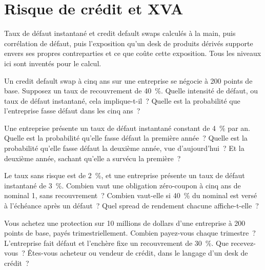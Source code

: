 \chapter{Risque de crédit et XVA}\label{ch:iv2:credit-and-xva}

\begin{ivtrains}
Taux de défaut instantané et credit default swaps calculés à la main, puis corrélation de défaut, puis l'exposition qu'un desk de produits dérivés supporte envers ses propres contreparties et ce que coûte cette exposition. Tous les niveaux ici sont inventés pour le calcul.
\end{ivtrains}

\begin{question}\label{iq:iv2:credit-and-xva:1}
Un credit default swap à cinq ans sur une entreprise se négocie à 200 points de base. Supposez un taux de recouvrement de 40~\%. Quelle intensité de défaut, ou taux de défaut instantané, cela implique-t-il~? Quelle est la probabilité que l'entreprise fasse défaut dans les cinq ans~?
\end{question}

\begin{question}\label{iq:iv2:credit-and-xva:2}
Une entreprise présente un taux de défaut instantané constant de 4~\% par an. Quelle est la probabilité qu'elle fasse défaut la première année~? Quelle est la probabilité qu'elle fasse défaut la deuxième année, vue d'aujourd'hui~? Et la deuxième année, sachant qu'elle a survécu la première~?
\end{question}

\begin{question}\label{iq:iv2:credit-and-xva:3}
Le taux sans risque est de 2~\%, et une entreprise présente un taux de défaut instantané de 3~\%. Combien vaut une obligation zéro-coupon à cinq ans de nominal 1, sans recouvrement~? Combien vaut-elle si 40~\% du nominal est versé à l'échéance après un défaut~? Quel spread de rendement chacune affiche-t-elle~?
\end{question}

\begin{question}\label{iq:iv2:credit-and-xva:4}
Vous achetez une protection sur 10 millions de dollars d'une entreprise à 200 points de base, payés trimestriellement. Combien payez-vous chaque trimestre~? L'entreprise fait défaut et l'enchère fixe un recouvrement de 30~\%. Que recevez-vous~? Êtes-vous acheteur ou vendeur de crédit, dans le langage d'un desk de crédit~?
\end{question}

